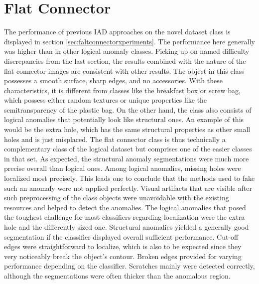 


\section{Flat Connector}
\label{sec:flatconnectordiscussion}

The performance of previous IAD approaches on the novel dataset class is displayed in section \ref{sec:faltconnectorxperiments}. The performance here generally was higher 
than in other logical anomaly classes. Picking up on named difficulty discrepancies from the last section, the results combined with the nature of the flat connector images 
are consistent with other results. The object in this class possesses a smooth surface, sharp edges, and no accessories. With these 
characteristics, it is different from classes like the breakfast box or screw bag, which possess either random textures or unique properties 
like the semitransparency of the plastic bag. On the other hand, the class also consists of logical anomalies that potentially look 
like structural ones. An example of this would be the extra hole, which has the same structural properties as other small holes and is 
just misplaced. The flat connector class is thus technically a complementary class of the logical dataset but comprises 
one of the easier classes in that set. \newline
As expected, the structural anomaly segmentations were much more precise overall than logical ones. Among logical anomalies, 
missing holes were localized most precisely. This leads one to conclude that the methods used to fake such an anomaly were not applied perfectly. 
Visual artifacts that are visible after such preprocessing of the class objects were unavoidable with the existing resources and  
helped to detect the anomalies. The logical anomalies that posed the toughest challenge for most classifiers regarding localization 
were the extra hole and the differently sized one. \newline
Structural anomalies yielded a generally good segmentation if the classifier displayed overall sufficient performance. Cut-off edges were straightforward to localize, which is also to be expected since they very noticeably break the object's contour. Broken edges provided for 
varying performance depending on the classifier. Scratches mainly were detected correctly, although the segmentations were often 
thicker than the anomalous region.



